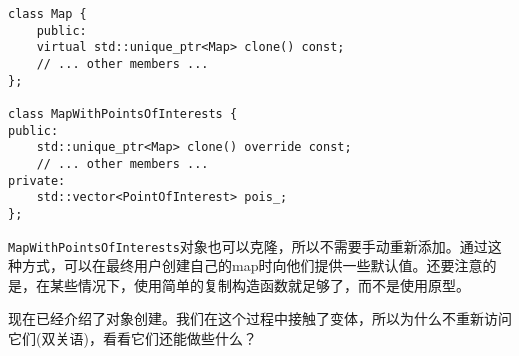 \begin{lstlisting}[style=styleCXX]
class Map {
	public:
	virtual std::unique_ptr<Map> clone() const;
	// ... other members ...
};

class MapWithPointsOfInterests {
public:
	std::unique_ptr<Map> clone() override const;
	// ... other members ...
private:
	std::vector<PointOfInterest> pois_;
};
\end{lstlisting}

\texttt{MapWithPointsOfInterests}对象也可以克隆，所以不需要手动重新添加。通过这种方式，可以在最终用户创建自己的map时向他们提供一些默认值。还要注意的是，在某些情况下，使用简单的复制构造函数就足够了，而不是使用原型。

现在已经介绍了对象创建。我们在这个过程中接触了变体，所以为什么不重新访问它们(双关语)，看看它们还能做些什么？






















